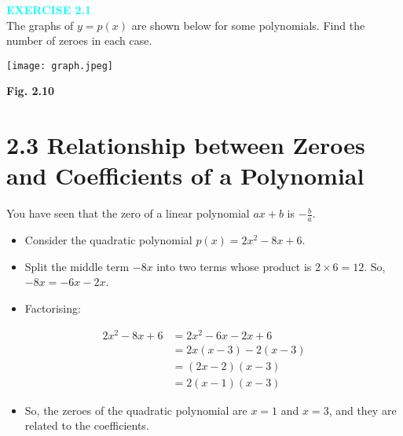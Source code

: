 \documentclass[12pt]{article}
\begin{document}
\vspace{-1em}
\begin{center}
\textcolor{cyan}{\textbf{EXERCISE 2.1}}\\
The graphs of $y = p(x)$ are shown below for some polynomials. Find the number of zeroes in each case.
\end{center}

\texttt{[image: graph.jpeg]}
\begin{center}
\textcolor{myblue}{\textbf{Fig. 2.10}}
\end{center}

\section*{2.3 Relationship between Zeroes and Coefficients of a Polynomial}

You have seen that the zero of a linear polynomial $ax + b$ is $-\frac{b}{a}$.

\begin{itemize}
  \item Consider the quadratic polynomial $p(x) = 2x^2 - 8x + 6$.
  \item Split the middle term $-8x$ into two terms whose product is $2 \times 6 = 12$. So, $-8x = -6x - 2x$.
  \item Factorising:
\end{itemize}

\begin{align*}
2x^2 - 8x + 6 &= 2x^2 - 6x - 2x + 6 \\
              &= 2x(x - 3) - 2(x - 3) \\
              &= (2x - 2)(x - 3) \\
              &= 2(x - 1)(x - 3)
\end{align*}

\begin{itemize}
  \item So, the zeroes of the quadratic polynomial are $x = 1$ and $x = 3$, and they are related to the coefficients.
\end{itemize}
\end{document}
